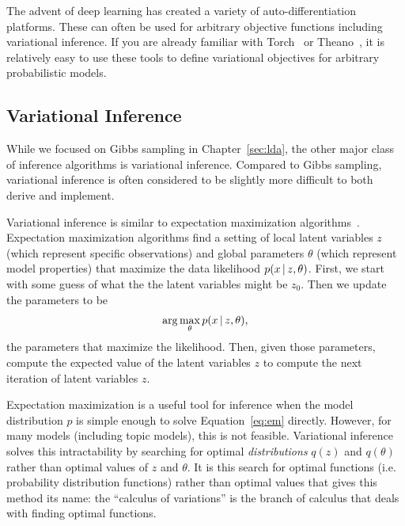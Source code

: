 The advent of deep learning has created a variety of
auto-differentiation platforms.  These can often be used for arbitrary
objective functions including variational inference.  If you are
already familiar with Torch~\citep{collobert-11} or Theano~\citep{theano}, it is relatively easy to use
these tools to define variational objectives for arbitrary
probabilistic models.

\subsection{Variational Inference}

While we focused on Gibbs sampling in Chapter~\ref{sec:lda}, the other major
class of inference algorithms is variational inference.  Compared to
Gibbs sampling, variational inference is often considered to be
slightly more difficult to both derive and implement.

Variational inference is similar to expectation maximization
algorithms~\citep{liang-07b}.  Expectation maximization algorithms find a
setting of local latent variables $z$ (which represent specific observations) and global parameters $\theta$ (which represent model properties) that maximize
the data likelihood $p(x \, | \, z, \theta)$.  First, we start with some guess
of what the the latent variables might be $z_0$.  Then we update the
parameters to be
\begin{equation}
  \arg \max_{\theta} p(x \, | \, z, \theta),
\label{eq:em}
\end{equation}
the parameters that maximize the likelihood.  Then, given those
parameters, compute the expected value of the latent variables $z$ to
compute the next iteration of latent variables $z$.

Expectation maximization is a useful tool for inference when the model
distribution $p$ is simple enough to solve Equation~\ref{eq:em}
directly.  However, for many models (including topic models), this is
not feasible.  Variational inference solves this intractability by
searching for optimal {\em distributions} $q(z)$ and $q(\theta)$ rather than optimal values of $z$ and $\theta$.
It is this search for optimal functions (i.e. probability distribution functions) rather than optimal values that gives this method its name: the ``calculus of variations'' is the branch of calculus that deals with finding optimal functions.

